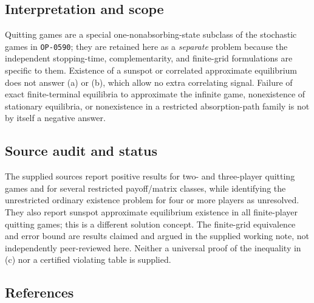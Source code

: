 \documentclass[11pt,a4paper]{article}
\newcommand{\Problemref}[1]{\texttt{#1}}
\begin{document}
\subsection*{Interpretation and scope}

Quitting games are a special one-nonabsorbing-state subclass of the
stochastic games in \Problemref{OP-0590}; they are retained here as a
\emph{separate} problem because the independent stopping-time,
complementarity, and finite-grid formulations are specific to them.
Existence of a sunspot or correlated approximate equilibrium does not
answer (a) or (b), which allow no extra correlating signal. Failure of
exact finite-terminal equilibria to approximate the infinite game,
nonexistence of stationary equilibria, or nonexistence in a restricted
absorption-path family is not by itself a negative answer.

\subsection*{Source audit and status}

The supplied sources report positive results for two- and three-player
quitting games and for several restricted payoff/matrix classes, while
identifying the unrestricted ordinary existence problem for four or
more players as unresolved. They also report sunspot approximate
equilibrium existence in all finite-player quitting games; this is a
different solution concept. The finite-grid equivalence and error
bound are results claimed and argued in the supplied working note,
not independently peer-reviewed here. Neither a universal proof of
the inequality in (c) nor a certified violating table is supplied.

\subsection*{References}
\end{document}
